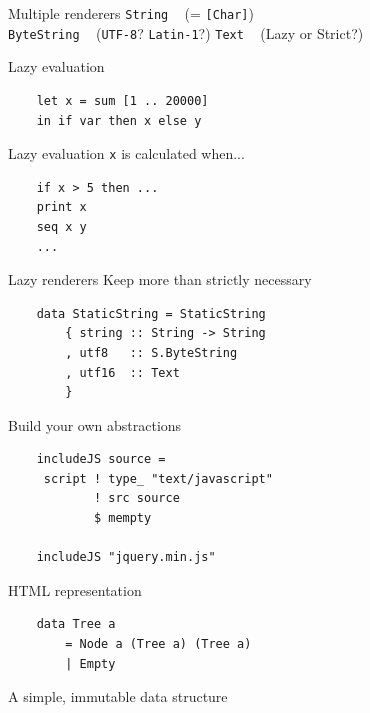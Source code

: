 \documentclass[20pt]{beamer}
\newcommand{\vspaced}{
    \vspace{5mm}
}
\begin{document}
\begin{frame}{Multiple renderers}
    \texttt{String} ~ (= \texttt{[Char]}) \\
    \texttt{ByteString} ~ (\texttt{UTF-8}? \texttt{Latin-1}?)
    \texttt{Text} ~ (Lazy or Strict?)
\end{frame}

\begin{frame}[fragile]{Lazy evaluation}
    \begin{lstlisting}
    let x = sum [1 .. 20000]
    in if var then x else y
    \end{lstlisting}
\end{frame}

\begin{frame}[fragile]{Lazy evaluation}
    \texttt{x} is calculated when...
    \vspaced
    \begin{lstlisting}
    if x > 5 then ...
    print x
    seq x y
    ...
    \end{lstlisting}
\end{frame}

\begin{frame}[fragile]{Lazy renderers}
    Keep more than strictly necessary
    \vspaced
    \begin{lstlisting}
    data StaticString = StaticString
        { string :: String -> String
        , utf8   :: S.ByteString
        , utf16  :: Text
        }
    \end{lstlisting}
\end{frame}

\begin{frame}[fragile]{Build your own abstractions}
    \begin{lstlisting}
    includeJS source =
     script ! type_ "text/javascript"
            ! src source
            $ mempty

    includeJS "jquery.min.js"
    \end{lstlisting}
\end{frame}

\begin{frame}[fragile]{HTML representation}
    \begin{lstlisting}
    data Tree a
        = Node a (Tree a) (Tree a)
        | Empty
    \end{lstlisting}
    \vspaced
    A simple, immutable data structure
\end{frame}
\end{document}
